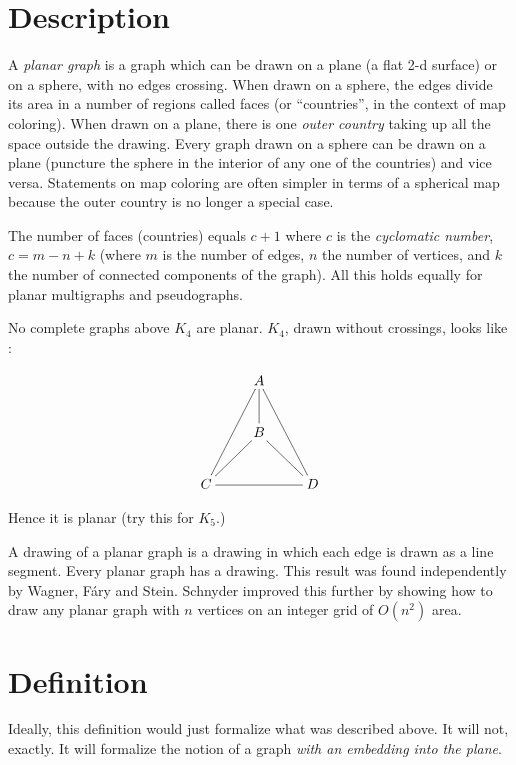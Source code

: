 \documentclass{article}
\theoremstyle{definition}
\begin{document}

\section*{Description}

A \emph{planar graph} is a graph which can be drawn on a plane (a flat 2-d surface) or on a sphere, with no edges crossing. When drawn on a sphere, the edges divide its area in a number of regions called faces (or ``countries'', in the context of map coloring). When drawn on a plane, there is one \emph{outer country} taking up all the space outside the drawing. Every graph drawn on a sphere can be drawn on a plane (puncture the sphere in the interior of any one of the countries) and vice versa. Statements on map coloring are often simpler in terms of a spherical map because the outer country is no longer a special case.

The number of faces (countries) equals $c+1$ where $c$ is the \emph{cyclomatic number}, $c=m-n+k$ (where $m$ is the number of edges, $n$ the number of vertices, and $k$ the number of connected components of the graph). All this holds equally for planar multigraphs and pseudographs.

No complete graphs above $K_4$ are planar.  $K_4$, drawn without crossings, looks like :

$$ 
\xymatrix{
  & A\ar@{-}[d] \ar@{-}[ddl] \ar@{-}[ddr] &    \\
  & B\ar@{-}[dl] \ar@{-}[dr] &    \\
C \ar@{-}[rr] &   & D } 
$$

Hence it is planar (try this for $K_5$.)

A  drawing of a planar graph is a drawing in which each edge is drawn as a  line segment. Every planar graph has a  drawing. This result was found independently by Wagner, F\'ary and Stein. Schnyder improved this further by showing how to draw any planar graph with $n$ vertices on an integer grid of $O(n^2)$ area.

\section*{Definition}

Ideally, this definition would just formalize what was described above.  It will not, exactly.  It will formalize the notion of a graph \emph{with an embedding into the plane}.
\end{document}
